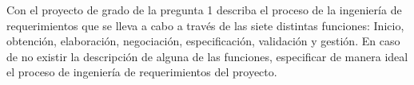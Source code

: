 Con el proyecto de grado de la pregunta 1 describa el proceso de la ingeniería de requerimientos que se lleva a cabo a través de las siete distintas funciones: Inicio, obtención, elaboración, negociación, especificación, validación y gestión. En caso de no existir la descripción de alguna de las funciones, especificar de manera ideal el proceso de ingeniería de requerimientos del proyecto.
